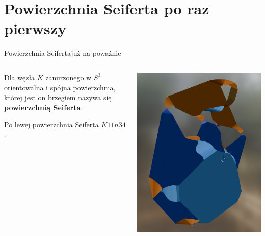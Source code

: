 \documentclass{beamer}
\begin{document}
\def\kreska{\tikz{
    \fill[red] (0,0) circle (0.2ex);
    \fill[red] (1ex, 1ex) circle (0.2ex);
    \draw[red] (0,0)--(1ex, 1ex);
}}

\def\kwadracik{\tikz{
    \fill[red](0,0) circle (0.2ex);
    \fill[red] (.8ex, 1ex) circle (.2ex);
    \fill[red] (2ex, 1.3ex) circle (.2ex);
    \fill[red] (2.1ex, -.2ex) circle (.2ex);
    \filldraw[color=red, fill=orange!40!bg-dim] (0,0)--(.8ex, 1ex)--(2ex, 1.3ex)--(2.1ex, -.2ex)--(0,0);
}}

\section{Powierzchnia Seiferta po raz pierwszy}

\begin{frame}{Powierzchnia Seiferta}{już na poważnie}
  \begin{columns}
    \begin{column}{0.5\textwidth}
      \begin{definition}
        Dla węzła $K$ zanurzonego w $S^3$ orientowalna i spójna powierzchnia, której jest on brzegiem nazywa się \textbf{\color{orange}powierzchnią Seiferta}.
      \end{definition} 
      Po lewej powierzchnia Seiferta $K11n34$.
    \end{column}
    \begin{column}{0.5\textwidth}
      \includegraphics[width=\textwidth]{rysuneczek.png}
    \end{column}
  \end{columns}
\end{frame}
\end{document}
